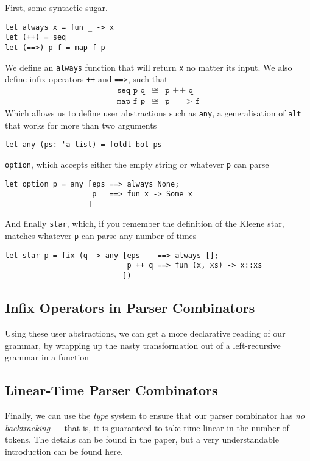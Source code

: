 First, some syntactic sugar.
\begin{verbatim}
let always x = fun _ -> x
let (++) = seq
let (==>) p f = map f p
\end{verbatim}
We define an \texttt{always} function that will return \texttt{x} no matter its input. We also define infix operators \texttt{++} and \texttt{==>}, such that 
\[
\begin{array}{rcl}
\texttt{seq p q} &\cong& \texttt{p ++ q}\\
\texttt{map f p}&\cong&\texttt{p ==> f}
\end{array}
\]
Which allows us to define user abstractions such as \texttt{any}, a generalisation of \texttt{alt} that works for more than two arguments
\begin{verbatim}
let any (ps: 'a list) = foldl bot ps
\end{verbatim}
\texttt{option}, which accepts either the empty string or whatever \texttt{p} can parse
\begin{verbatim}
let option p = any [eps ==> always None;
                    p   ==> fun x -> Some x
                   ]
\end{verbatim}
And finally \texttt{star}, which, if you remember the definition of the Kleene star, matches whatever \texttt{p} can parse any number of times
\begin{verbatim}
let star p = fix (q -> any [eps    ==> always [];
                            p ++ q ==> fun (x, xs) -> x::xs
                           ])
\end{verbatim}

\subsection{Infix Operators in Parser Combinators}
Using these user abstractions, we can get a more declarative reading of our grammar, by wrapping up the nasty transformation out of a left-recursive grammar in a function 

\subsection{Linear-Time Parser Combinators}
Finally, we can use the \textit{type} system to ensure that our parser combinator has \textit{no backtracking} --- that is, it is guaranteed to take time linear in the number of tokens. The details can be found in the paper, but a very understandable introduction can be found \href{https://semantic-domain.blogspot.com/2023/07/linear-time-parser-combinators.html}{here}.